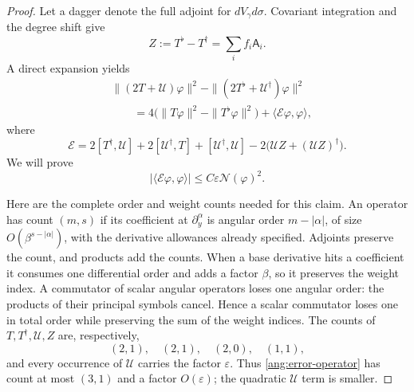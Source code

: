 \begin{proof}
Let a dagger denote the full adjoint for $dV_\gamma d\sigma$.
Covariant integration and the degree shift give
\begin{equation}\label{ang:Z-definition}
 Z:=T^\flat-T^\dagger=\sum_i f_i\mathsf A_i.
\end{equation}
A direct expansion yields
\begin{equation}\label{ang:norm-comparison}
 \begin{split}
 &\|(2T+\mathcal U)\varphi\|^2-
                \|(2T^\flat+\mathcal U^\dagger)\varphi\|^2\\
 &\qquad=4\bigl(\|T\varphi\|^2-\|T^\flat\varphi\|^2\bigr)
                       +\langle\mathcal E\varphi,\varphi\rangle,
 \end{split}
\end{equation}
where
\begin{equation}\label{ang:error-operator}
 \mathcal E=2[T^\dagger,\mathcal U]+2[\mathcal U^\dagger,T]+[\mathcal U^\dagger,\mathcal U]
                       -2\bigl(\mathcal U Z+(\mathcal U Z)^\dagger\bigr).
\end{equation}
We will prove
\begin{equation}\label{ang:error-form-bound}
 |\langle\mathcal E\varphi,\varphi\rangle|
                         \le C\varepsilon\mathcal N(\varphi)^2.
\end{equation}

Here are the complete order and weight counts needed for this claim.
An operator has count $(m,s)$ if its coefficient at $\partial_y^\alpha$
is angular order $m-|\alpha|$, of size $O(\beta^{s-|\alpha|})$,
with the derivative allowances already specified.
Adjoints preserve the count, and products add the counts.  When a base
derivative hits a coefficient it consumes one differential order and
adds a factor $\beta$, so it preserves the weight index.  A commutator
of scalar angular operators loses one angular order: the products of
their principal symbols cancel.  Hence a scalar commutator loses one in
total order while preserving the sum of the weight indices.
The counts of $T,T^\dagger,\mathcal U,Z$ are, respectively,
\[
 (2,1),\quad(2,1),\quad(2,0),\quad(1,1),
\]
and every occurrence of $\mathcal U$ carries the factor $\varepsilon$.  Thus
\eqref{ang:error-operator} has count at most $(3,1)$ and a factor
$O(\varepsilon)$; the quadratic $\mathcal U$ term is smaller.


\end{proof}
